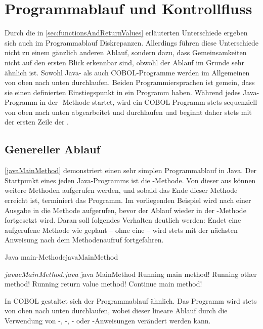 \section{Programmablauf und Kontrollfluss}\label{programmablauf}
Durch die in \autoref{sec:functionsAndReturnValues} erläuterten Unterschiede ergeben sich auch im Programmablauf Diskrepanzen. Allerdings führen diese Unterschiede nicht zu einem gänzlich anderen Ablauf, sondern dazu, dass Gemeinsamkeiten nicht auf den ersten Blick erkennbar sind, obwohl der Ablauf im Grunde sehr ähnlich ist. Sowohl Java- als auch COBOL-Programme werden im Allgemeinen von oben nach unten durchlaufen. Beiden Programmiersprachen ist gemein, dass sie einen definierten Einstiegspunkt in ein Programm haben. Während jedes Java-Programm in der -Methode startet, wird ein COBOL-Programm stets sequenziell von oben nach unten abgearbeitet und durchlaufen und beginnt daher stets mit der ersten Zeile der .

\subsection{Genereller Ablauf}

\autoref{javaMainMethod} demonstriert einen sehr simplen Programmablauf in Java. Der Startpunkt eines jeden Java-Programms ist die -Methode. Von dieser aus können weitere Methoden aufgerufen werden, und sobald das Ende dieser Methode erreicht ist, terminiert das Programm. Im vorliegenden Beispiel wird nach einer Ausgabe in  die Methode  aufgerufen, bevor der Ablauf wieder in der -Methode fortgesetzt wird. Daran soll folgendes Verhalten deutlich werden: Endet eine aufgerufene Methode wie geplant -- \dahe ohne eine  -- wird stets mit der nächsten Anweisung nach dem Methodenaufruf fortgefahren. 

\begin{codeWithCaption}{Java main-Methode}{javaMainMethod}
\begin{shellwindow}
$ javac MainMethod.java 
$ java MainMethod
Running main method!
Running other method!
Running return value method!
Continue main method!
\end{shellwindow}
\end{codeWithCaption}

In COBOL gestaltet sich der Programmablauf ähnlich. Das Programm wird stets von oben nach unten durchlaufen, wobei dieser lineare Ablauf \zB durch die Verwendung von -, -, - oder -Anweisungen verändert werden kann.

